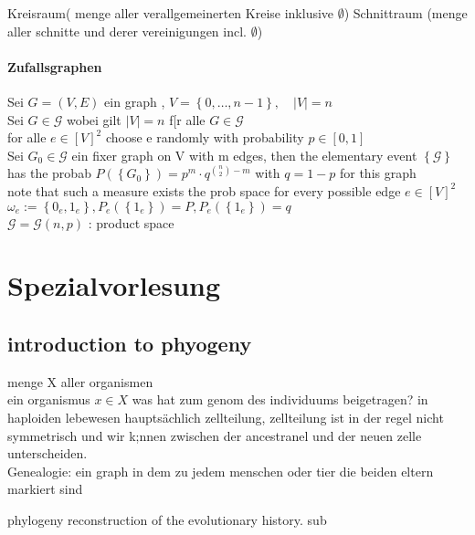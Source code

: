 \documentclass[a4paper]{article}
\theoremstyle{definition}
\theoremstyle{remark}
\begin{document}
Kreisraum( menge aller verallgemeinerten Kreise inklusive $\emptyset$)
Schnittraum (menge aller schnitte und derer vereinigungen incl. $\emptyset$)
\paragraph{Zufallsgraphen}
\label{par:zufallsgraphen}

Sei $G=(V,E)$ ein graph , $V=\left\{ 0,\dots,n-1 \right\}, \quad |V|=n$\\ 
Sei $G \in \mathcal{G}$ wobei gilt $|V|=n$ f[r alle $G \in \mathcal{G}$ \\
  for alle $e \in \left[ V \right]^{2} $ choose e randomly with probability  $ p\in [0,1]$\\
Sei $G_0 \in \mathcal{G}$ ein fixer graph on V with m edges, then the elementary event $\left\{ \mathcal{G} \right\}$ has the probab
$P\left( \left\{ G_0 \right\} \right)=p^m\cdot q^{\binom{n}{2}-m}$ with $q=1-p$ for this graph
\\ 
note that such a measure exists
the prob space for every possible edge $e\in [V]^2$ \\
$\omega _e :=\left\{ 0_e,1_e \right\}, P_e\left( \left\{ 1_e \right\} \right)=P, P_e\left( \left\{ 1_e \right\} \right)=q$\\
$\mathcal{G}=\mathcal{G}(n,p)$ : product space
\section{Spezialvorlesung}
\label{sec:spezialvorlesung}

\subsection{introduction to phyogeny}
\label{sub:introduction_to_phyogeny}

menge X aller organismen \\ 
ein organismus $x\in X$ was hat zum genom des individuums beigetragen?
in haploiden lebewesen hauptsächlich zellteilung, zellteilung ist in der regel nicht symmetrisch und wir k;nnen zwischen der ancestranel und der neuen zelle unterscheiden.\\
Genealogie: ein graph in dem zu jedem menschen oder tier die beiden eltern markiert sind


phylogeny 
reconstruction of the evolutionary history.
sub
\end{document}

